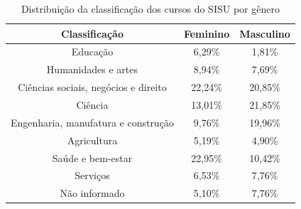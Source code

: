             \begin{table}[]
                \centering
                \begin{tabular}{ccc}
                \hline
                Classificação                        & Feminino & Masculino \\ \hline
                Educação                             & 6,29\%   & 1,81\%    \\ \hline
                Humanidades e artes                  & 8,94\%   & 7,69\%    \\ \hline
                Ciências sociais, negócios e direito & 22,24\%  & 20,85\%   \\ \hline
                Ciência                              & 13,01\%  & 21,85\%   \\ \hline
                Engenharia, manufatura e construção  & 9,76\%   & 19,96\%   \\ \hline
                Agricultura                          & 5,19\%   & 4,90\%    \\ \hline
                Saúde e bem-estar                    & 22,95\%  & 10,42\%   \\ \hline
                Serviços                             & 6,53\%   & 7,76\%    \\ \hline
                Não informado                        & 5,10\%   & 7,76\%    \\ \hline
                \end{tabular}
                \caption{Distribuição da classificação dos cursos do SISU por gênero}
                \label{tab:classificacao-curso-genero}
                \end{table}

